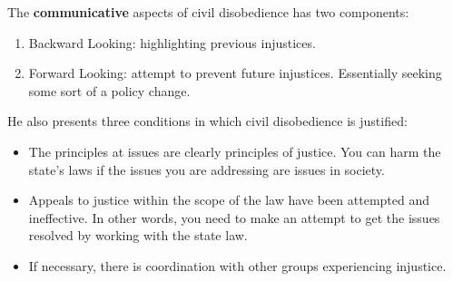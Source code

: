 \documentclass[letterpaper]{article}
\begin{document}
The \textbf{communicative} aspects of civil disobedience has two components:
\begin{enumerate}
    \item Backward Looking: highlighting previous injustices. 
    \item Forward Looking: attempt to prevent future injustices. Essentially seeking some sort of a policy change. 
\end{enumerate}
He also presents three conditions in which civil disobedience is justified: 
\begin{itemize}
    \item The principles at issues are clearly principles of justice. You can harm the state's laws if the issues you are addressing are issues in society. 
    \item Appeals to justice within the scope of the law have been attempted and ineffective. In other words, you need to make an attempt to get the issues resolved by working with the state law.
    \item If necessary, there is coordination with other groups experiencing injustice. 
\end{itemize}
\end{document}
